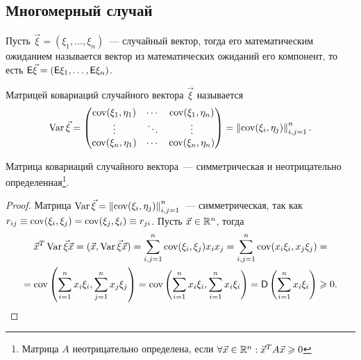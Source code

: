 \subsection*{Многомерный случай}
\begin{definition}
	Пусть $\vec \xi  = (\xi_1, \ldots, \xi_n )$~--- случайный вектор, тогда его математическим ожиданием называется вектор из математических ожиданий его компонент, то есть $\mathsf{E} \vec \xi = (\mathsf{E} \xi_1, \ldots, \mathsf{E} \xi_n)$.
\end{definition}
\begin{definition}
	Матрицей ковариаций случайного вектора $\vec \xi$ называется 
	$$ \operatorname{Var} \vec \xi = \begin{pmatrix}
		\operatorname{cov} ( \xi_1, \eta_1) & \cdots & \operatorname{cov} (\xi_1, \eta_n)\\
		\vdots  & \ddots & \vdots\\
		\operatorname{cov} ( \xi_n, \eta_1) & \cdots & \operatorname{cov} (\xi_n, \eta_n)
	\end{pmatrix} = \left\| \operatorname{cov} (\xi_i, \eta_j ) \right\|_{i, j = 1}^n.$$
\end{definition}
\begin{lemma}
	Матрица ковариаций случайного вектора~--- симметрическая и неотрицательно определенная\footnote{Матрица $A$ неотрицательно определена, если $\forall \vec x \in \mathbb{R}^n: {\vec x}^T A \vec x \geqslant 0$}.
	\begin{proof}
		Матрица $\operatorname{Var} \vec \xi = \left\| \operatorname{cov} (\xi_i, \eta_j ) \right\|_{i, j = 1}^n$~--- симметрическая, так как $r_{ij} \equiv \operatorname{cov} ( \xi_i, \xi_j ) = \operatorname{cov} (\xi_j, \xi_i) \equiv r_{ji}$. Пусть $\vec x \in \mathbb{R}^n$, тогда 
		\begin{multline*}
			{\vec x}^T \operatorname{Var} \vec \xi \vec x = ( \vec x, \operatorname{Var} \vec \xi \vec x ) = \sum_{i,j=1}^n \operatorname{cov} (\xi_i, \xi_j ) x_i x_j = \sum_{i,j=1}^n \operatorname{cov} (x_i \xi_i, x_j \xi_j) =\\ = \operatorname{cov} \left( \sum_{i=1}^n  x_i \xi_i, \sum_{j=1}^n x_j \xi_j \right) = \operatorname{cov} \left( \sum_{i=1}^n  x_i \xi_i, \sum_{i=1}^n x_i \xi_i \right) =\mathsf{D} \left( \sum_{i=1}^n x_i \xi_i \right) \geqslant 0.
		\end{multline*}
	\end{proof}
\end{lemma}

